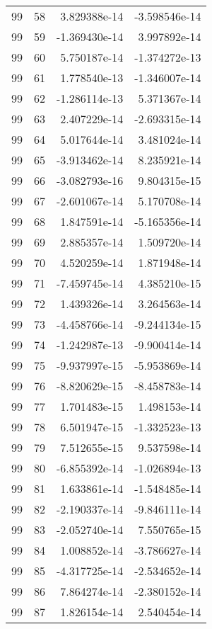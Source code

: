 \begin{tabular}{rrrr}
  99 &   58 &  3.829388e-14 & -3.598546e-14 \\
  99 &   59 & -1.369430e-14 &  3.997892e-14 \\
  99 &   60 &  5.750187e-14 & -1.374272e-13 \\
  99 &   61 &  1.778540e-13 & -1.346007e-14 \\
  99 &   62 & -1.286114e-13 &  5.371367e-14 \\
  99 &   63 &  2.407229e-14 & -2.693315e-14 \\
  99 &   64 &  5.017644e-14 &  3.481024e-14 \\
  99 &   65 & -3.913462e-14 &  8.235921e-14 \\
  99 &   66 & -3.082793e-16 &  9.804315e-15 \\
  99 &   67 & -2.601067e-14 &  5.170708e-14 \\
  99 &   68 &  1.847591e-14 & -5.165356e-14 \\
  99 &   69 &  2.885357e-14 &  1.509720e-14 \\
  99 &   70 &  4.520259e-14 &  1.871948e-14 \\
  99 &   71 & -7.459745e-14 &  4.385210e-15 \\
  99 &   72 &  1.439326e-14 &  3.264563e-14 \\
  99 &   73 & -4.458766e-14 & -9.244134e-15 \\
  99 &   74 & -1.242987e-13 & -9.900414e-14 \\
  99 &   75 & -9.937997e-15 & -5.953869e-14 \\
  99 &   76 & -8.820629e-15 & -8.458783e-14 \\
  99 &   77 &  1.701483e-15 &  1.498153e-14 \\
  99 &   78 &  6.501947e-15 & -1.332523e-13 \\
  99 &   79 &  7.512655e-15 &  9.537598e-14 \\
  99 &   80 & -6.855392e-14 & -1.026894e-13 \\
  99 &   81 &  1.633861e-14 & -1.548485e-14 \\
  99 &   82 & -2.190337e-14 & -9.846111e-14 \\
  99 &   83 & -2.052740e-14 &  7.550765e-15 \\
  99 &   84 &  1.008852e-14 & -3.786627e-14 \\
  99 &   85 & -4.317725e-14 & -2.534652e-14 \\
  99 &   86 &  7.864274e-14 & -2.380152e-14 \\
  99 &   87 &  1.826154e-14 &  2.540454e-14 \\

\end{tabular}
